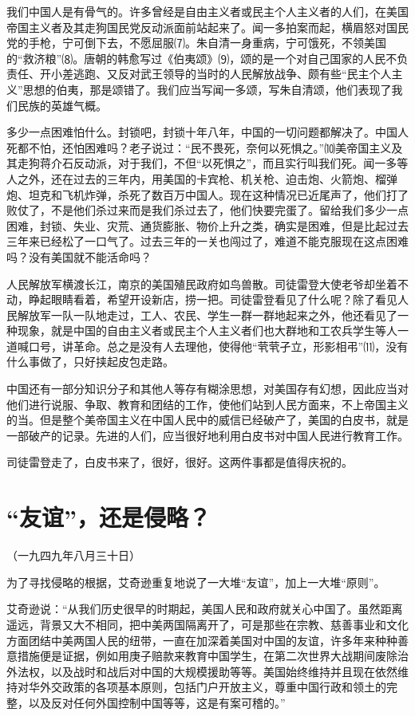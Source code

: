 \documentclass[UTF-8, a5paper, 12pt]{ctexart}
\begin{document}
我们中国人是有骨气的。许多曾经是自由主义者或民主个人主义者的人们，在美国帝国主义者及其走狗国民党反动派面前站起来了。闻一多拍案而起，横眉怒对国民党的手枪，宁可倒下去，不愿屈服⑺。朱自清一身重病，宁可饿死，不领美国的“救济粮”⑻。唐朝的韩愈写过《伯夷颂》⑼，颂的是一个对自己国家的人民不负责任、开小差逃跑、又反对武王领导的当时的人民解放战争、颇有些“民主个人主义”思想的伯夷，那是颂错了。我们应当写闻一多颂，写朱自清颂，他们表现了我们民族的英雄气概。

多少一点困难怕什么。封锁吧，封锁十年八年，中国的一切问题都解决了。中国人死都不怕，还怕困难吗？老子说过：“民不畏死，奈何以死惧之。”⑽美帝国主义及其走狗蒋介石反动派，对于我们，不但“以死惧之”，而且实行叫我们死。闻一多等人之外，还在过去的三年内，用美国的卡宾枪、机关枪、迫击炮、火箭炮、榴弹炮、坦克和飞机炸弹，杀死了数百万中国人。现在这种情况已近尾声了，他们打了败仗了，不是他们杀过来而是我们杀过去了，他们快要完蛋了。留给我们多少一点困难，封锁、失业、灾荒、通货膨胀、物价上升之类，确实是困难，但是比起过去三年来已经松了一口气了。过去三年的一关也闯过了，难道不能克服现在这点困难吗？没有美国就不能活命吗？

人民解放军横渡长江，南京的美国殖民政府如鸟兽散。司徒雷登大使老爷却坐着不动，睁起眼睛看着，希望开设新店，捞一把。司徒雷登看见了什么呢？除了看见人民解放军一队一队地走过，工人、农民、学生一群一群地起来之外，他还看见了一种现象，就是中国的自由主义者或民主个人主义者们也大群地和工农兵学生等人一道喊口号，讲革命。总之是没有人去理他，使得他“茕茕孑立，形影相弔”⑾，没有什么事做了，只好挟起皮包走路。

中国还有一部分知识分子和其他人等存有糊涂思想，对美国存有幻想，因此应当对他们进行说服、争取、教育和团结的工作，使他们站到人民方面来，不上帝国主义的当。但是整个美帝国主义在中国人民中的威信已经破产了，美国的白皮书，就是一部破产的记录。先进的人们，应当很好地利用白皮书对中国人民进行教育工作。

司徒雷登走了，白皮书来了，很好，很好。这两件事都是值得庆祝的。

\section{“友谊”，还是侵略？}

（一九四九年八月三十日）

为了寻找侵略的根据，艾奇逊重复地说了一大堆“友谊”，加上一大堆“原则”。

艾奇逊说：“从我们历史很早的时期起，美国人民和政府就关心中国了。虽然距离遥远，背景又大不相同，把中美两国隔离开了，可是那些在宗教、慈善事业和文化方面团结中美两国人民的纽带，一直在加深着美国对中国的友谊，许多年来种种善意措施便是证据，例如用庚子赔款来教育中国学生，在第二次世界大战期间废除治外法权，以及战时和战后对中国的大规模援助等等。美国始终维持并且现在依然维持对华外交政策的各项基本原则，包括门户开放主义，尊重中国行政和领土的完整，以及反对任何外国控制中国等等，这是有案可稽的。”
\end{document}
